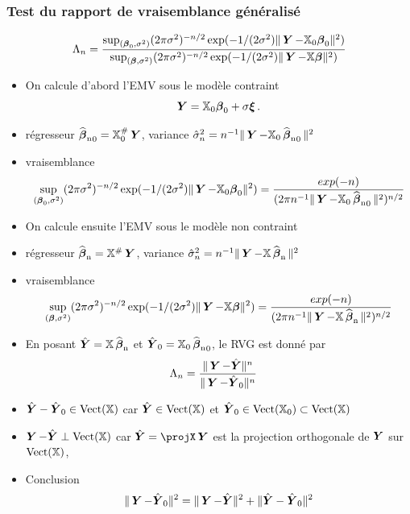 \begin{frame}
\frametitle{Test du rapport de vraisemblance généralisé}
\[
\Lambda_n = \frac{\sup_{(\truebeta_0,\sigma^2)} (2 \pi \sigma^2)^{-n/2} \exp(-1/(2\sigma^2) \| \bY - \regressmat_0 \truebeta_0\|^2)}{\sup_{(\truebeta,\sigma^2)} (2 \pi \sigma^2)^{-n/2} \exp(-1/(2\sigma^2) \| \bY - \regressmat \truebeta\|^2)}
\]
{
\begin{itemize}
\item On calcule d'abord l'EMV sous le modèle contraint
\[
\bY = \regressmat_0 \truebeta_0 + \sigma \bnoise \eqsp.
\]
\item \alert{régresseur} $\estregress_0= \regressmat_0^{\#} \bY$, \alert{variance} $\hat{\sigma}_n^2= n^{-1} \| \bY - \regressmat_0 \estregress_0\|^2$
\item \alert{vraisemblance}
\[
\sup_{(\truebeta_0,\sigma^2)} (2 \pi \sigma^2)^{-n/2} \exp(-1/(2\sigma^2) \| \bY - \regressmat_0 \truebeta_0\|^2)
= \frac{exp(-n)}{(2 \pi n^{-1} \| \bY - \regressmat_0 \estregress_0\|^2)^{n/2}}
\]
\end{itemize}
}
{
\begin{itemize}
\item On calcule ensuite l'EMV sous le modèle non contraint
\pause \item \alert{régresseur} $\estregress= \regressmat^{\#} \bY$, \alert{variance} $\hat{\sigma}_n^2= n^{-1} \| \bY - \regressmat \estregress\|^2$
\pause \item \alert{vraisemblance}
\[
\sup_{(\truebeta,\sigma^2)} (2 \pi \sigma^2)^{-n/2} \exp(-1/(2\sigma^2) \| \bY - \regressmat \truebeta\|^2)
= \frac{exp(-n)}{(2 \pi n^{-1} \| \bY - \regressmat \estregress \|^2)^{n/2}}
\]
\end{itemize}
}
{
\begin{itemize}
\item En posant $\predY= \regressmat \estregress$ et $\predY_0= \regressmat_0 \estregress_0$, le RVG est donné par
\begin{align*}
\Lambda_n &= \frac{\| \bY - \predY \|^n}{\| \bY - \predY_0 \|^n}
\end{align*}
\pause \item $\predY - \predY_0 \in \vect(\regressmat)$ car $\predY \in \vect(\regressmat)$ et $\predY_0 \in \vect(\regressmat_0) \subset \vect(\regressmat)$
\pause \item $\bY - \predY \perp \vect(\regressmat)$ car $\predY= \projX \bY$ est la projection orthogonale de $\bY$ sur $\vect(\regressmat)$,
\pause \item \alert{Conclusion}
\[
\| \bY - \predY_0 \|^2 = \|\bY - \predY \|^2 + \| \predY - \predY_0 \|^2
\]
\end{itemize}
}
\end{frame}

